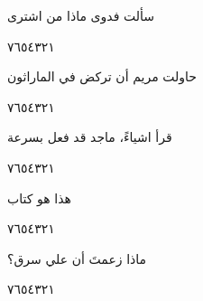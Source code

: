 \documentclass[11pt, a4paper]{article}
\begin{document}
{\vspace{0.5\baselineskip}\begin{flushright}
\textarabic{سألت فدوى ماذا من اشترى}
\end{flushright}

\begin{center}
        \hfill\textarabic{٧}\hfill\textarabic{٦}\hfill\textarabic{٥}\hfill\textarabic{٤}\hfill\textarabic{٣}\hfill\textarabic{٢}\hfill\textarabic{١}
        \end{center}


\vspace{0.5\baselineskip}\begin{flushright}
\textarabic{حاولت مريم أن تركض في الماراثون}
\end{flushright}

\begin{center}
        \hfill\textarabic{٧}\hfill\textarabic{٦}\hfill\textarabic{٥}\hfill\textarabic{٤}\hfill\textarabic{٣}\hfill\textarabic{٢}\hfill\textarabic{١}
        \end{center}


\vspace{0.5\baselineskip}\begin{flushright}
\textarabic{قرأ اشياءً، ماجد قد فعل بسرعة}
\end{flushright}

\begin{center}
        \hfill\textarabic{٧}\hfill\textarabic{٦}\hfill\textarabic{٥}\hfill\textarabic{٤}\hfill\textarabic{٣}\hfill\textarabic{٢}\hfill\textarabic{١}
        \end{center}


\vspace{0.5\baselineskip}\begin{flushright}
\textarabic{هذا هو كتاب}
\end{flushright}

\begin{center}
        \hfill\textarabic{٧}\hfill\textarabic{٦}\hfill\textarabic{٥}\hfill\textarabic{٤}\hfill\textarabic{٣}\hfill\textarabic{٢}\hfill\textarabic{١}
        \end{center}


\vspace{0.5\baselineskip}\begin{flushright}
\textarabic{ماذا زعمتَ أن علي سرق؟}
\end{flushright}

\begin{center}
        \hfill\textarabic{٧}\hfill\textarabic{٦}\hfill\textarabic{٥}\hfill\textarabic{٤}\hfill\textarabic{٣}\hfill\textarabic{٢}\hfill\textarabic{١}
        \end{center}

}
\end{document}
